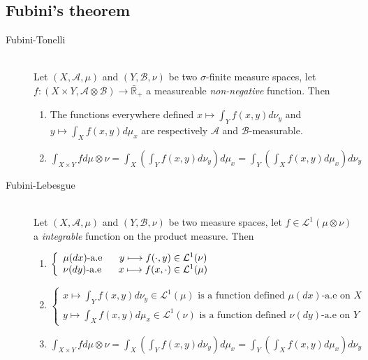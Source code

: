 \documentclass[a4paper,10pt]{article}
\begin{document}
\subsection{Fubini's theorem}
\begin{description}
 \item[Fubini-Tonelli] \hfill \\ 
 Let $(X,\mathcal{A},\mu)$ and $(Y,\mathcal{B},\nu)$ be two $\sigma$-finite measure spaces, let $f:(X\times Y, \mathcal{A} \otimes \mathcal{B})\longrightarrow \bar{\mathbb{R}}_+$ a measureable \textit{non-negative} function. Then
 \begin{enumerate}[i]
  \item The functions everywhere defined $x\longmapsto \int_{Y}f(x,y)d\nu_y$ and $y\longmapsto \int_{X}f(x,y)d\mu_x$ are respectively $\mathcal{A}$ and $\mathcal{B}$-measurable.
  \item $\int_{X\times Y} fd\mu \otimes \nu = \int_X (\int_{Y}f(x,y)d\nu_y )d\mu_x = \int_Y(\int_{X}f(x,y)d\mu_x)d\nu_y$
 \end{enumerate} 
 \item[Fubini-Lebesgue] \hfill \\
 Let $(X,\mathcal{A},\mu)$ and $(Y,\mathcal{B},\nu)$ be two measure spaces, let $f \in \mathcal{L}^1(\mu \otimes \nu)$ a \textit{integrable} function on the product measure. Then
  \begin{enumerate}[i]
   \item $
	  \left\{
	  \begin{array}{l}
	  \mu(dx)\text{-a.e } \hspace{5mm} y\longmapsto f(\cdot,y) \in \mathcal{L}^1(\nu)   \\
	  \nu(dy)\text{-a.e } \hspace{5mm} x\longmapsto f(x,\cdot) \in \mathcal{L}^1(\mu)  
	  \end{array}
	  \right.
	 $
   \item $
	  \left\{
	  \begin{array}{l}
	  x\longmapsto \int_Y f(x,y)d\nu_y \in \mathcal{L}^1(\mu)  \text{ is a function defined } \mu(dx)\text{-a.e on } X\\
	  y\longmapsto \int_X f(x,y)d\mu_x \in \mathcal{L}^1(\nu)  \text{ is a function defined } \nu(dy)\text{-a.e on } Y
	  \end{array}
	  \right.
	 $
   \item $\int_{X\times Y} fd\mu \otimes \nu = \int_X (\int_{Y}f(x,y)d\nu_y )d\mu_x = \int_Y(\int_{X}f(x,y)d\mu_x)d\nu_y$
  \end{enumerate}

 \end{description}
 
\end{document}
